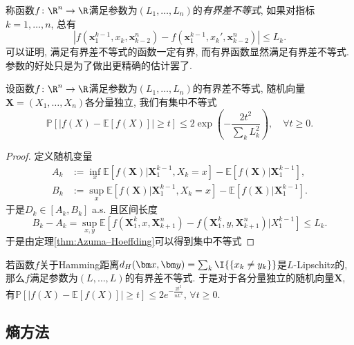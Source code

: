称函数$f \colon \R^n \to \R$满足参数为$(L_1, \dots, L_n)$的\emph{有界差不等式}, 如果对指标$k = 1, \dots, n$, 总有
\begin{equation*}
	|f(\bm x_1^{k-1}, x_k, \bm x_{k-2}^n) - f(\bm x_1^{k-1}, x_k', \bm x_{k-2}^n)| 
	\leq L_k. 
\end{equation*}
可以证明, 满足有界差不等式的函数一定有界, 而有界函数显然满足有界差不等式. 
参数的好处只是为了做出更精确的估计罢了. 

\begin{corollary}[有界差不等式]
	设函数$f \colon \R^n \to \R$满足参数为$(L_1, \dots, L_n)$的有界差不等式, 随机向量$\bm X = (X_1, \dots, X_n)$各分量独立, 我们有集中不等式
	\begin{equation*}
		\mathbb{P}[|f(X) - \mathbb{E}[f(X)]| \geq t] 
		\leq 2 \exp\left( - \frac{2 t^2}{\sum_k L_k^2} \right), 
		\quad \forall t \geq 0. 
	\end{equation*}
\end{corollary}
\begin{proof}
	定义随机变量 
	\begin{align*}
		A_k &:= \inf_x \mathbb{E}[f(\bm X)|\bm X_1^{k-1}, X_k = x] - \mathbb{E}[f(\bm X)|\bm X_1^{k-1}], \\
		B_k &:= \sup_x \mathbb{E}[f(\bm X)|\bm X_1^{k-1}, X_k = x] - \mathbb{E}[f(\bm X)|\bm X_1^{k-1}]. 
	\end{align*} 
	于是$D_k \in [A_k, B_k]$ a.s. 且区间长度
	\begin{equation*}
		B_k - A_k
		= \sup_{x, y} \mathbb{E}[f(\bm X_1^k, x, \bm X_{k+1}^n) - f(\bm X_1^k, y, \bm X_{k+1}^n) | X_1^{k-1}] 
		\leq L_k. 
	\end{equation*}
	于是由定理\ref{thm:Azuma–Hoeffding}可以得到集中不等式
\end{proof}

\begin{example}
	若函数$f$关于Hamming距离$d_H(\bm x, \bm y) = \sum_k \I{\{x_k \neq y_k\}}$是$L$-Lipschitz的, 那么$f$满足参数为$(L, \dots, L)$的有界差不等式. 
	于是对于各分量独立的随机向量$\bm X$, 有$\mathbb{P}[|f(X) - \mathbb{E}[f(X)]| \geq t] \leq 2 e^{-\frac{2 t^2}{n L^2}}$, $\forall t \geq 0$. 
\end{example}
\subsection{熵方法}

